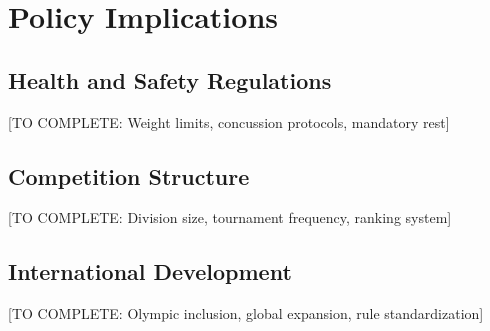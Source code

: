\section{Policy Implications}

\subsection{Health and Safety Regulations}

[TO COMPLETE: Weight limits, concussion protocols, mandatory rest]

\subsection{Competition Structure}

[TO COMPLETE: Division size, tournament frequency, ranking system]

\subsection{International Development}

[TO COMPLETE: Olympic inclusion, global expansion, rule standardization]